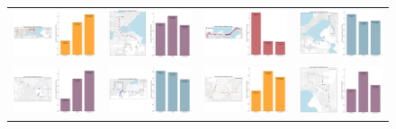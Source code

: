 \documentclass[b4paper]{article}
\begin{document}
\begin{figure}
\begin{center}
\begin{tabular}{ cccc }
  \includegraphics[width=44mm]{Route_12.png}  &   \includegraphics[width=44mm]{Route_13.png}  & \includegraphics[width=44mm]{Route_15.png}  & \includegraphics[width=44mm]{Route_16.png} \\
  
  \includegraphics[width=44mm]{Route_17.png}  &   \includegraphics[width=44mm]{Route_18.png}  & \includegraphics[width=44mm]{Route_20.png}  & \includegraphics[width=44mm]{Route_21.png} \\
  

\end{tabular}
\end{center}
\end{figure}
\end{document}
